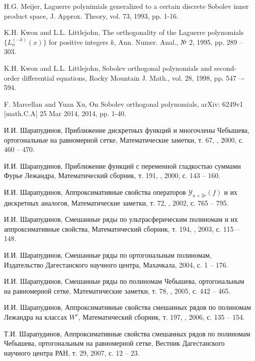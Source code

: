 \begin{thebibliography}{1}
H.G. Meijer,
Laguerre polynimials generalized to a certain discrete Sobolev inner product space,
J. Approx. Theory, vol. 73, 1993, pp. 1-16.


K.H. Kwon and L.L. Littlejohn,
The orthogonality of the Laguerre polynomials $\{L_n^{(-k)}(x)\}$ for positive integers $k$,
Ann. Numer. Anal., № 2, 1995, pp. 289 -- 303.

 K.H. Kwon and L.L. Littlejohn,
Sobolev orthogonal polynomials and second-order differential equations, Rocky Mountain J. Math.,
vol. 28, 1998, pp. 547 –- 594.

F. Marcellan and Yuan Xu,
On Sobolev orthogonal polynomials,
arXiv: 6249v1 [math.C.A] 25 Mar 2014, 2014, pp. 1-40.

 И.И. Шарапудинов,
Приближение дискретных функций и многочлены Чебышева, ортогональные на равномерной сетке,
Математические заметки, т. 67, , 2000, с. 460 -- 470.

И.И. Шарапудинов,
Приближение функций с переменной гладкостью суммами Фурье Лежандра,
Математический сборник, т. 191, , 2000, с. 143 -- 160.


И.И. Шарапудинов,
Аппроксимативные свойства операторов $\mathcal{Y}_{n+2r}(f)$ и их дискретных аналогов,
Математические заметки, т. 72, , 2002, с. 765 -- 795.

И.И. Шарапудинов,
Смешанные ряды по ультрасферическим полиномам и их аппроксимативные свойства,
Математический сборник, т. 194, , 2003, с. 115 -- 148.

И.И. Шарапудинов,
Смешанные ряды по ортогональным полиномам,
Издательство Дагестанского научного центра, Махачкала, 2004, с. 1 -- 176.


И.И. Шарапудинов,
Смешанные ряды по полиномам Чебышева, ортогональным на равномерной сетке,
Математические заметки, т. 78, , 2005, с. 442 -- 465.


И.И. Шарапудинов,
Аппроксимативные свойства смешанных рядов по полиномам Лежандра на классах $W^r$,
Математический сборник, т. 197, , 2006, с. 135 -- 154.

Т.И. Шарапудинов,
Аппроксимативные свойства смешанных рядов по полиномам Чебышева, ортогональным на равномерной сетке,
Вестник Дагестанского научного центра РАН, т. 29, 2007, с. 12 -- 23.



\end{thebibliography}
